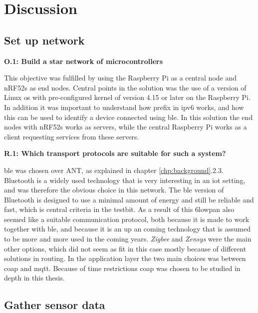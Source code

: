 \chapter{Discussion}
\label{chp:dataAnalysis}

\section{Set up network}

\noindent \textbf{O.1: Build a star network of microcontrollers}

\noindent  This objective was fulfilled by using the Raspberry Pi as a central node and nRF52s as end nodes. Central points in the solution was the use of a version of Linux \gls{os} with pre-configured kernel of version 4.15 or later on the \gls{Raspberry Pi}. In addition it was important to understand how prefix in \gls{ipv6} works, and how this can be used to identify a device connected using \gls{ble}. In this solution the end nodes with \glspl{nRF52} works as servers, while the central Raspberry Pi works as a client requesting services from these servers. 


\noindent \textbf{R.1: Which transport protocols are suitable for such a system?}

\noindent \gls{ble} was chosen over ANT, as explained in chapter \ref{chp:background}.2.3. Bluetooth is a widely used technology that is very interesting in an \gls{iot} setting, and was therefore the obvious choice in this network. The \gls{ble} version of Bluetooth is designed to use a minimal amount of energy and still be reliable and fast, which is central criteria in the testbit. As a result of this \gls{6lowpan} also seemed like a suitable communication protocol, both because it is made to work together with \gls{ble}, and because it is an up an coming technology that is assumed to be more and more used in the coming years. \textit{Zigbee} and \textit{Zensys} were the main other options, which did not seem as fit in this case mostly because of different solutions in routing. In the application layer the two main choices was between \gls{coap} and \gls{mqtt}. Because of time restrictions \gls{coap} was chosen to be studied in depth in this thesis. 

\newpage


\section{Gather sensor data}

